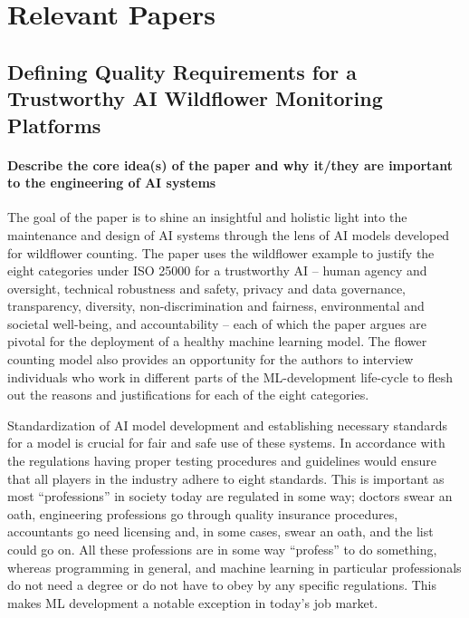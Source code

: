 \documentclass[pra, onecolumn,superscriptaddress,nofootinbib]{revtex4}
\begin{document}
\section{Relevant Papers}
\subsection{Defining Quality Requirements for a Trustworthy AI Wildflower Monitoring Platforms \cite{wildflower}}

  \paragraph{Describe the core idea(s) of the paper and why it/they are important to the engineering of AI systems\\}

    The goal of the paper is to shine an insightful and holistic light into the maintenance and design of AI systems through the lens of AI models developed for wildflower counting. The paper uses the wildflower example to justify the eight categories under ISO 25000 for a trustworthy AI -- human agency and oversight, technical robustness and safety, privacy and data governance, transparency, diversity, non-discrimination and fairness, environmental and societal well-being, and accountability -- each of which the paper argues are pivotal for the deployment of a healthy machine learning model. The flower counting model also provides an opportunity for the authors to interview individuals who work in different parts of the ML-development life-cycle to flesh out the reasons and justifications for each of the eight categories.

    Standardization of AI model development and establishing necessary standards for a model is crucial for fair and safe use of these systems. In accordance with the regulations having proper testing procedures and guidelines would ensure that all players in the industry adhere to eight standards. This is important as most ``professions'' in society today are regulated in some way; doctors swear an oath, engineering professions go through quality insurance procedures, accountants go need licensing and, in some cases, swear an oath, and the list could go on. All these professions are in some way ``profess'' to do something, whereas programming in general, and machine learning in particular professionals do not need a degree or do not have to obey by any specific regulations. This makes ML development a notable exception in today's job market.\\
\end{document}

